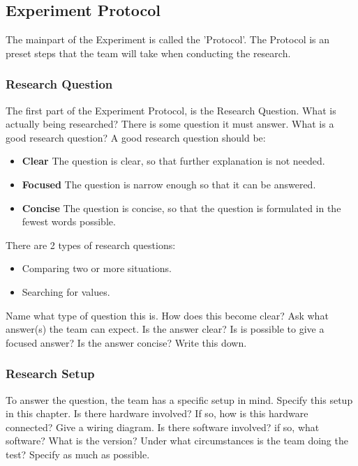 \documentclass[10pt]{report}
\begin{document}
\subsection{Experiment Protocol}

The mainpart of the Experiment is called the 'Protocol'. The Protocol is an preset steps that the team will take when conducting the research.

\subsubsection{Research Question}

The first part of the Experiment Protocol, is the Research Question. What is actually being researched? There is some question it must answer. What is a good research question? A good research question should be:

\begin{itemize}
	\item \textbf{Clear} The question is clear, so that further explanation is not needed.
	\item \textbf{Focused} The question is narrow enough so that it can be answered.
	\item \textbf{Concise} The question is concise, so that the question is formulated in the fewest words possible.
\end{itemize}

There are 2 types of research questions:

\begin{itemize}
	\item Comparing two or more situations.
	\item Searching for values.
\end{itemize}

Name what type of question this is. How does this become clear? Ask what answer(s) the team can expect. Is the answer clear? Is is possible to give a focused answer? Is the answer concise? Write this down.

\subsubsection{Research Setup}

To answer the question, the team has a specific setup in mind. Specify this setup in this chapter. Is there hardware involved? If so, how is this hardware connected? Give a wiring diagram. Is there software involved? if so, what software? What is the version? Under what circumstances is the team doing the test? Specify as much as possible.
\end{document}
